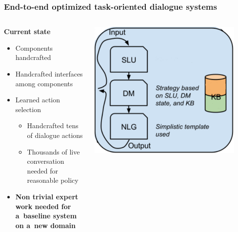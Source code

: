 \documentclass[10pt, compress,british,xcolor={svgnames,dvipsnames,x11names},trans]{beamer}
\begin{document}
\begin{frame}\frametitle{End-to-end optimized task-oriented dialogue systems}
\begin{columns}
\begin{column}{0.45\textwidth}
    {\bf Current state} 
    \begin{itemize}
        \item Components handcrafted
        \item Handcrafted interfaces among components 
        \item Learned action selection
            \begin{itemize}
                \item Handcrafted tens of dialogue actions
                \item Thousands of live conversation needed for reasonable policy~\cite{gasic_line_2011}
            \end{itemize}
        \item {\bf \color{red} Non trivial expert work needed for a~baseline system on a~new domain}
    \end{itemize}
\end{column}
\begin{column}{0.2\textwidth}
        \begin{center} 
            \includegraphics[width=0.9\textwidth]{arch.png} \\
        \end{center}
            \vfill
        \begin{center} 

\end{center}
\end{column}
\end{columns}
\end{frame}
\end{document}
